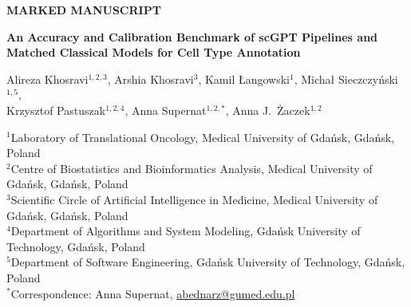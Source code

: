 \documentclass[11pt,a4paper]{article}
\begin{document}
\begin{titlepage}
\begin{center}
{\small\bfseries MARKED MANUSCRIPT\par}
\vspace{0.5cm}
{\LARGE\bfseries An Accuracy and Calibration Benchmark of scGPT Pipelines and Matched Classical Models for Cell Type Annotation\par}
\vspace{1.0cm}
{\large
Alireza Khosravi$^{1,2,3}$, Arshia Khosravi$^{3}$, Kamil {\L}angowski$^{1}$, Micha{\l} Sieczczy{\'n}ski$^{1,5}$,\\[4pt]
Krzysztof Pastuszak$^{1,2,4}$, Anna Supernat$^{1,2,*}$, Anna J.~{\.Z}aczek$^{1,2}$\par}
\vspace{0.7cm}
\begin{minipage}{0.92\textwidth}\small
$^{1}$Laboratory of Translational Oncology, Medical University of Gda\'nsk, Gda\'nsk, Poland\\
$^{2}$Centre of Biostatistics and Bioinformatics Analysis, Medical University of Gda\'nsk, Gda\'nsk, Poland\\
$^{3}$Scientific Circle of Artificial Intelligence in Medicine, Medical University of Gda\'nsk, Gda\'nsk, Poland\\
$^{4}$Department of Algorithms and System Modeling, Gda\'nsk University of Technology, Gda\'nsk, Poland\\
$^{5}$Department of Software Engineering, Gda\'nsk University of Technology, Gda\'nsk, Poland\\[5pt]
$^{*}$Correspondence: Anna Supernat, \href{mailto:abednarz@gumed.edu.pl}{abednarz@gumed.edu.pl}
\end{minipage}
\vspace{0.8cm}

\end{center}

\color{blue!65!black}

\end{titlepage}

\onehalfspacing
\linenumbers
\color{blue!65!black}






\color{black}



\color{blue!65!black}


\end{document}
